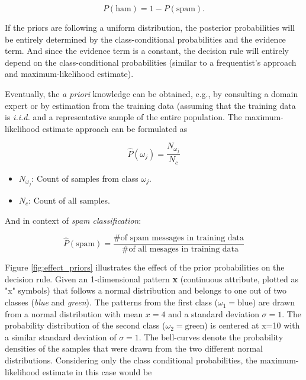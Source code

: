 \documentclass{article}
\begin{document}
\begin{equation} P(\text{ham})= 1-P(\text{spam}). \end{equation}

If the priors are following a uniform distribution, the posterior probabilities will be entirely determined by the class-conditional probabilities and the evidence term. And since the evidence term is a constant, the decision rule will entirely depend on the class-conditional probabilities (similar to a frequentist's approach and maximum-likelihood estimate).

Eventually, the \emph{a priori} knowledge can be obtained, e.g., by consulting a domain expert or by estimation from the training data (assuming that the training data is \emph{i.i.d.} and a representative sample of the entire population. The maximum-likelihood estimate approach can be formulated as

\begin{equation} \hat{P}(\omega_j) = \frac{N_{\omega_j}}{N_c}  \end{equation}

\begin{itemize}
	\item $N_{\omega_j}$: Count of samples from class $\omega_j$.
	\item $N_c$: Count of all samples.
\end{itemize}

And in context of  \emph{spam classification}:


\begin{equation}\hat{P}(\text{spam}) = \frac{\text{\# of spam messages in training data}}{\text{ \# of all mesages in training data}} \end{equation}


Figure \ref{fig:effect_priors} illustrates the effect of the prior probabilities on the decision rule. Given an 1-dimensional pattern \textbf{x} (continuous attribute, plotted as "x" symbols) that follows a normal distribution and belongs to one out of two classes (\emph{blue} and \emph{green}). The patterns from the first class ($\omega_1=\text{blue}$) are drawn from a normal distribution with mean  $x=4$ and a standard deviation $\sigma=1$. The probability distribution of the second class ($\omega_2=\text{green}$) is centered at x=10 with a similar standard deviation of $\sigma=1$. The bell-curves denote the probability densities of the samples that were drawn from the two different normal distributions. Considering only the class conditional probabilities, the maximum-likelihood estimate in this case would be  
\end{document}
